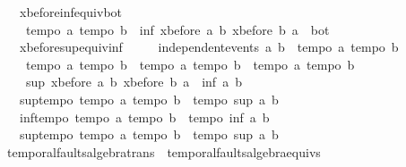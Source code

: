\begin{isabellebody}
\ \ \ xbefore{\isacharunderscore}inf{\isacharunderscore}equiv{\isacharunderscore}bot{\isacharcolon}\ \isanewline
\ \ \ \ {\isachardoublequoteopen}{\isasymlbrakk}tempo{}\ a{\isacharsemicolon}\ tempo{}\ b{\isasymrbrakk}\ {\isasymLongrightarrow}\ inf\ {\isacharparenleft}xbefore\ a\ b{\isacharparenright}\ {\isacharparenleft}xbefore\ b\ a{\isacharparenright}\ {\isacharequal}\ bot{\isachardoublequoteclose}\isanewline
\ \ \ xbefore{\isacharunderscore}sup{\isacharunderscore}equiv{\isacharunderscore}inf{\isacharcolon}\ \isanewline
\ \ \ \ {\isachardoublequoteopen}independent{\isacharunderscore}events\ a\ b\ {\isasymLongrightarrow}\ {\isasymlbrakk}tempo{}\ a{\isacharsemicolon}\ tempo{}\ b{\isasymrbrakk}\ {\isasymLongrightarrow}\ \isanewline
\ \ \ \ {\isasymlbrakk}tempo{}\ a{\isacharsemicolon}\ tempo{}\ b{\isasymrbrakk}\ {\isasymLongrightarrow}\ {\isasymlbrakk}tempo{}\ a{\isacharsemicolon}\ tempo{}\ b{\isasymrbrakk}\ {\isasymLongrightarrow}\ {\isasymlbrakk}tempo{}\ a{\isacharsemicolon}\ tempo{}\ b{\isasymrbrakk}\ {\isasymLongrightarrow}\ \isanewline
\ \ \ \ sup\ {\isacharparenleft}xbefore\ a\ b{\isacharparenright}\ {\isacharparenleft}xbefore\ b\ a{\isacharparenright}\ {\isacharequal}\ inf\ a\ b{\isachardoublequoteclose}\isanewline
\ \ \ sup{\isacharunderscore}tempo{}{\isacharcolon}\ {\isachardoublequoteopen}{\isasymlbrakk}tempo{}\ a{\isacharsemicolon}\ tempo{}\ b{\isasymrbrakk}\ {\isasymLongrightarrow}\ tempo{}\ {\isacharparenleft}sup\ a\ b{\isacharparenright}{\isachardoublequoteclose}\isanewline
\ \ \ inf{\isacharunderscore}tempo{}{\isacharcolon}\ {\isachardoublequoteopen}{\isasymlbrakk}tempo{}\ a{\isacharsemicolon}\ tempo{}\ b{\isasymrbrakk}\ {\isasymLongrightarrow}\ tempo{}\ {\isacharparenleft}inf\ a\ b{\isacharparenright}{\isachardoublequoteclose}\isanewline
\ \ \ sup{\isacharunderscore}tempo{}{\isacharcolon}\ {\isachardoublequoteopen}{\isasymlbrakk}tempo{}\ a{\isacharsemicolon}\ tempo{}\ b{\isasymrbrakk}\ {\isasymLongrightarrow}\ tempo{}\ {\isacharparenleft}sup\ a\ b{\isacharparenright}{\isachardoublequoteclose}%
\isamarkuptrue%
\isamarkupfalse%
\ temporal{\isacharunderscore}faults{\isacharunderscore}algebra{\isacharunderscore}trans\ {\isacharequal}\ temporal{\isacharunderscore}faults{\isacharunderscore}algebra{\isacharunderscore}equivs\ {\isacharplus}\isanewline

\end{isabellebody}
